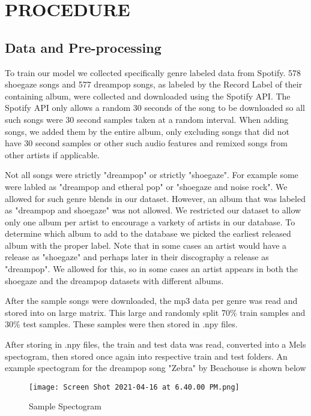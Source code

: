 \documentclass[letterpaper, 12 pt, conference]{ieeeconf}  %
\begin{document}
\section{PROCEDURE}


\subsection{Data and Pre-processing}

To train our model we collected specifically genre labeled data from Spotify. 578 shoegaze songs and 577 dreampop songs, as labeled by the Record Label of their containing album, were collected and downloaded using the Spotify API.
The Spotify API only allows a random 30 seconds of the song to be downloaded so all such songs were 30 second samples taken at a random interval. When adding  songs, we added them by the entire album, only excluding songs that did not have 30 second samples or other such audio features and remixed songs from other artists if applicable.

Not all songs were strictly "dreampop" or strictly "shoegaze". For example some were labled as "dreampop and etheral pop" or "shoegaze and noise rock". We allowed for such genre blends in our dataset. However, an album that was labeled as "dreampop and shoegaze" was not allowed. We restricted our dataset to allow only one album per artist to encourage a varkety of artists in our database. To determine which album to add to the database we picked the earliest released album with the proper label. Note that in some cases an artist would have a release as "shoegaze" and perhaps later in their discography a release as "dreampop". We allowed for this, so in some cases an artist appears in both the shoegaze and the dreampop datasets with different albums. 

After the sample songs were downloaded, the mp3 data per genre was read and stored into on large matrix. This large and randomly split 70\% train samples and 30\% test samples. These samples were then stored in .npy files.

After storing in .npy files, the train and test data was read, converted into a Mels spectogram, then stored once again into respective train and test folders. An example spectogram for the dreampop song "Zebra" by Beachouse is shown below



\begin{figure*}
  \texttt{[image: Screen Shot 2021-04-16 at 6.40.00 PM.png]}
  \caption{Sample Spectogram}
\end{figure*}
\end{document}
